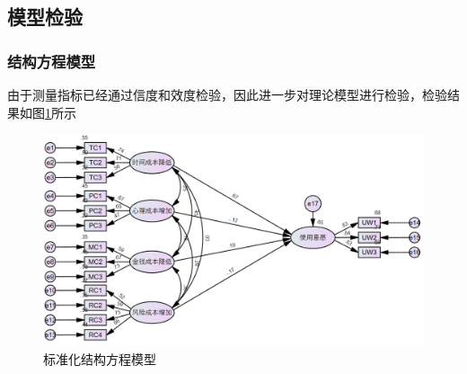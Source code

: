 \documentclass[12pt,UTF8]{ctexart}
\begin{document}
\begin{spacing}{1.25}
\subsection{模型检验}
\subsubsection{结构方程模型}
由于测量指标已经通过信度和效度检验，因此进一步对理论模型进行检验，检验结果如图\ref{fig:sem}所示
\begin{figure}[H]
\centering
\includegraphics[scale = .6]{sem.png}
\caption{标准化结构方程模型}
\label{fig:sem}
\end{figure}


\end{spacing}
\end{document}
